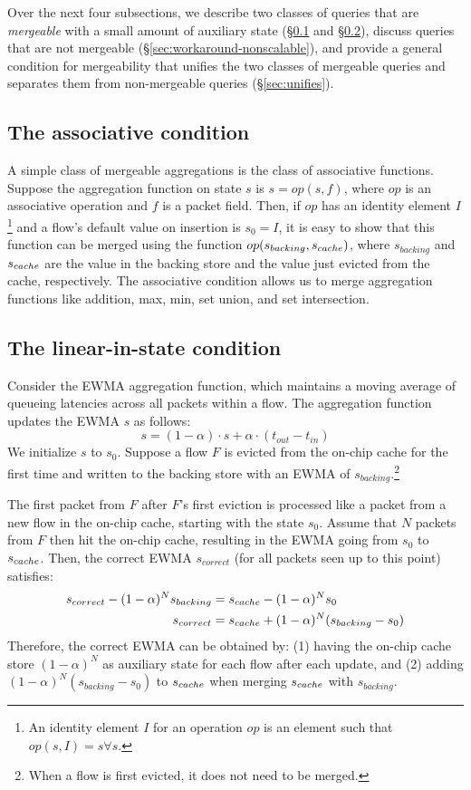 Over the next four subsections, we describe two classes of queries that are
{\em mergeable} with a small amount of auxiliary state (\S\ref{sec:associative}
and \S\ref{sec:linear-in-state-description}), discuss queries that are not
mergeable (\S\ref{sec:workaround-nonscalable}), and provide a general condition
for mergeability that unifies the two classes of mergeable queries and
separates them from non-mergeable queries (\S\ref{sec:unifies}).

\subsection{The associative condition}
\label{sec:associative}

A simple class of mergeable aggregations is the class of associative functions.
Suppose the aggregation function on state $s$ is $s = op(s, f)$, where $op$ is
an associative operation and $f$ is a packet field. Then, if $op$ has an
identity element $I$\footnote{An identity element $I$ for an operation $op$ is
an element such that $op(s, I) = s \forall s$.} and a flow's default value on
insertion is $s_0 = I$, it is easy to show that this function can be merged
using the function $op(s_{backing}, s_{cache})$, where $s_{backing}$ and
$s_{cache}$ are the value in the backing store and the value just evicted from
the cache, respectively. The associative condition allows us to merge
aggregation functions like addition, max, min, set union, and set intersection.

\subsection{The linear-in-state condition}
\label{sec:linear-in-state-description}

Consider the EWMA aggregation function, which maintains a moving
average of queueing latencies across all packets within a flow. The aggregation
function updates the EWMA $s$ as follows:
\[ s = (1 - \alpha) \cdot s + \alpha \cdot (t_{out} - t_{in}) \]
We initialize $s$ to $s_0$. Suppose a flow $F$
is evicted from the on-chip cache for the first time and written to the backing
store with an EWMA of $s_{backing}$.\footnote{When a flow is first evicted, it does
not need to be merged.}

The first packet from $F$ after $F$'s first eviction is processed like a packet
from a new flow in the on-chip cache, starting with the state $s_0$. Assume
that $N$ packets from $F$ then hit the on-chip cache, resulting in the EWMA
going from $s_0$ to $s_{cache}$.  Then, the correct EWMA $s_{correct}$ (\ie for
all packets seen up to this point) satisfies:
\begin{align*}
s_{correct} - (1-\alpha)^N s_{backing} &= s_{cache} - (1-\alpha)^N s_0 \\
s_{correct} &= s_{cache} + (1-\alpha)^N(s_{backing} - s_0)
\end{align*}
Therefore, the correct EWMA can be obtained by: (1) having the on-chip cache
store $(1-\alpha)^N$ as auxiliary state for each flow after each update, and
(2) adding $(1-\alpha)^N(s_{backing} - s_0)$ to $s_{cache}$ when merging
$s_{cache}$ with $s_{backing}$.

